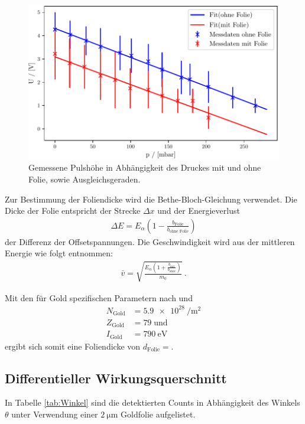 \begin{figure}
  \centering
  \includegraphics{build/test.pdf}
  \caption{Gemessene Pulshöhe in Abhängigkeit des Druckes mit und ohne
Folie, sowie Ausgleichsgeraden.}
  \label{fig:Druck}
\end{figure}

Zur Bestimmung der Foliendicke wird die Bethe-Bloch-Gleichung \label{bethe} verwendet. Die Dicke der Folie entspricht der Strecke $\Delta x$ und der Energieverlust
\begin{align}
	\Delta E = E_\alpha(1-\frac{b_\text{Folie}}{b_\text{ohne Folie}})
\end{align}
der Differenz der Offsetspannungen. Die Geschwindigkeit wird aus der mittleren Energie wie folgt entnommen:
\begin{align}
	\bar{v}=\sqrt{\frac{E_\alpha(1+\frac{b_{\text{mit}}}{b_{\text{ohne}}})}{m_0}} \:.
\end{align}

Mit den für Gold spezifischen Parametern nach \cite{lenntech} und \cite{pdg}
\begin{align*}
	N_\text{Gold}&=\SI{5.9e28}{\per\meter\squared}\\
	Z_\text{Gold}&=79\; \text{und}\\
	I_\text{Gold}&=\SI{790}{\electronvolt}
\end{align*}
ergibt sich somit eine Foliendicke von $d_{\text{Folie}} = $.

\subsection{Differentieller Wirkungsquerschnitt}
In Tabelle \ref{tab:Winkel} sind die detektierten Counts in Abhängigkeit des Winkels $\theta$ unter Verwendung einer $\SI{2}{\micro\meter}$ Goldfolie aufgelistet. 


